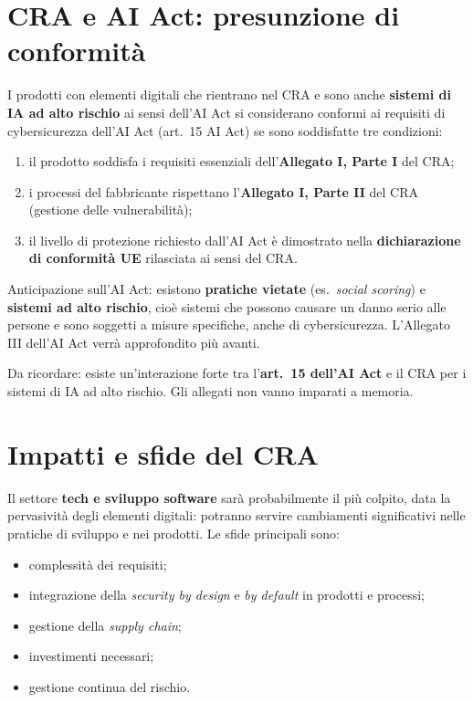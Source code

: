 \section{CRA e AI Act: presunzione di conformità}

I prodotti con elementi digitali che rientrano nel CRA e sono anche \textbf{sistemi di IA ad alto
rischio} ai sensi dell'AI Act si considerano conformi ai requisiti di cybersicurezza dell'AI Act
(art.~15 AI Act) se sono soddisfatte tre condizioni:
\begin{enumerate}
  \item il prodotto soddisfa i requisiti essenziali dell'\textbf{Allegato I, Parte I} del CRA;
  \item i processi del fabbricante rispettano l'\textbf{Allegato I, Parte II} del CRA
    (gestione delle vulnerabilità);
  \item il livello di protezione richiesto dall'AI Act è dimostrato nella \textbf{dichiarazione di
    conformità UE} rilasciata ai sensi del CRA.
\end{enumerate}

\noindent Anticipazione sull'AI Act: esistono \textbf{pratiche vietate} (es.\ \emph{social scoring})
e \textbf{sistemi ad alto rischio}, cioè sistemi che possono causare un danno serio alle persone e
sono soggetti a misure specifiche, anche di cybersicurezza. L'Allegato III dell'AI Act verrà
approfondito più avanti.

\begin{esame}
Da ricordare: esiste un'interazione forte tra l'\textbf{art.~15 dell'AI Act} e il CRA per i sistemi
di IA ad alto rischio. Gli allegati non vanno imparati a memoria.
\end{esame}

\section{Impatti e sfide del CRA}

Il settore \textbf{tech e sviluppo software} sarà probabilmente il più colpito, data la pervasività
degli elementi digitali: potranno servire cambiamenti significativi nelle pratiche di sviluppo e nei
prodotti. Le sfide principali sono:
\begin{itemize}
  \item complessità dei requisiti;
  \item integrazione della \emph{security by design} e \emph{by default} in prodotti e processi;
  \item gestione della \emph{supply chain};
  \item investimenti necessari;
  \item gestione continua del rischio.
\end{itemize}

